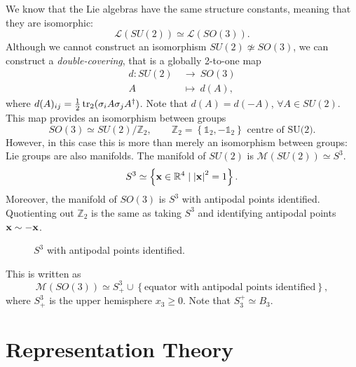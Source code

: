We know that the Lie algebras have the same structure constants, meaning that they are isomorphic:
\begin{equation}
  \mathscr{L}(SU(2)) \simeq \mathscr{L}(SO(3)).
\end{equation}
Although we cannot construct an isomorphism $SU(2) \not\simeq SO(3)$, we can construct a \emph{double-covering}, that is a globally 2-to-one map
\begin{equation}
  \begin{split}
    d \colon SU(2) \ &\to\  SO(3) \\
    A \ &\mapsto\  d(A),
  \end{split}
\end{equation}
where $d(A)_{ij} = \frac{1}{2} \tr_2 ( \sigma_i A \sigma_j A^{\dagger})$. Note that $d(A) = d(-A)$, $\forall A \in SU(2)$.
This map provides an isomorphism between groups
\begin{equation}
  SO(3) \simeq SU(2) / \mathbb{Z}_2, \qquad \mathbb{Z}_2 = \left\{ \mathbb{1}_2, -\mathbb{1}_2 \right\} \text{ centre of SU(2)}.
\end{equation}
However, in this case this is more than merely an isomorphism between groups: Lie groups are also manifolds. 
The manifold of $SU(2)$ is $\mathcal{M}(SU(2)) \simeq S^3$.
\begin{equation}
  S^3 \simeq \left\{ \vb{x} \in \mathbb{R}^4 \mid \abs{\vb{x}}^2 = 1 \right\}.
\end{equation}
Moreover, the manifold of $SO(3)$ is $S^3$ with antipodal points identified.
Quotienting out $\mathbb{Z}_2$ is the same as taking $S^3$ and identifying antipodal points $\vb{x} \sim -\vb{x}$.
\begin{figure}[tbhp]
  \centering
  \def\svgwidth{0.3\columnwidth}
  
  \caption{$S^3$ with antipodal points identified.}
  \label{fig:l9f1}
\end{figure}
This is written as
\begin{equation}
  \mathcal{M}(SO(3)) \simeq S^3_+ \cup \left\{ \text{equator with antipodal points identified} \right\},
\end{equation}
where $S^3_+$ is the upper hemisphere $x_3 \geq 0$. Note that $S^+_3 \simeq B_3$.

\chapter{Representation Theory}%
\label{cha:representation_theory}

